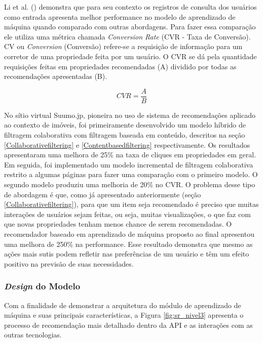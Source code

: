 Li et al. (\citeyear{Summo:2017}) demonstra que para seu contexto os registros de consulta dos usuários como entrada apresenta melhor performance no modelo de aprendizado de máquina quando comparado com outras abordagens. Para fazer essa comparação ele utiliza uma métrica chamada \textit{Conversion Rate} (CVR - Taxa de Conversão). CV ou \textit{Conversion} (Conversão) refere-se a requisição de informação para um corretor de uma propriedade feita por um usuário. O CVR se dá pela quantidade requisições feitas em propriedades recomendadas (A) dividido por todas as recomendações apresentadas (B).

\begin{equation}
    CVR=\frac{A}{B}
\end{equation}

No sítio virtual Suumo.jp, pioneira no uso de sistema de recomendações aplicado ao contexto de imóveis, foi primeiramente desenvolvido um modelo híbrido de filtragem colaborativa com filtragem baseada em conteúdo, descritos na seção \ref{Collaborativefiltering} e \ref{Contentbasedfiltering} respectivamente. Os resultados apresentaram uma melhora de 25\% na taxa de cliques em propriedades em geral. Em seguida, foi implementado um modelo incremental de filtragem colaborativa restrito a algumas páginas para fazer uma comparação com o primeiro modelo. O segundo modelo produziu uma melhoria de 20\% no CVR. O problema desse tipo de abordagem é que, como já apresentado anteriormente (seção \ref{Collaborativefiltering}), para que um item seja recomendado é preciso que muitas interações de usuários sejam feitas, ou seja, muitas visualizações, o que faz com que novas propriedades tenham menos chance de serem recomendadas. O recomendador baseado em aprendizado de máquina proposto ao final apresentou uma melhora de 250\% na performance. Esse resultado demonstra que mesmo as ações mais sutis podem refletir nas preferências de um usuário e têm um efeito positivo na previsão de suas necessidades.

\subsubsection{\textit{Design} do Modelo}

Com a finalidade de demonstrar a arquitetura do módulo de aprendizado de máquina e suas principais características, a Figura \ref{fig:sr_nivel3} apresenta o processo de recomendação mais detalhado dentro da API e as interações com as outras tecnologias.

